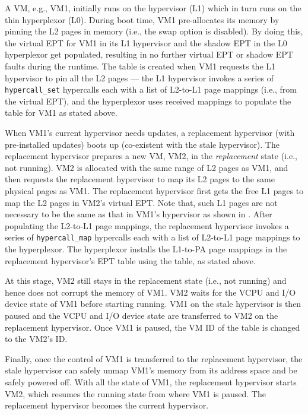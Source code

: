 A VM, e.g., VM1, initially runs on the hypervisor (L1) which in turn runs on the thin hyperplexor (L0). During boot time, VM1 pre-allocates its memory by pinning the L2 pages in memory (i.e., the swap option is disabled). By doing this, the virtual EPT for VM1 in its L1 hypervisor and the shadow EPT in the L0 hyperplexor get populated, resulting in no further virtual EPT or shadow EPT faults during the runtime. The \arch table is created when VM1 requests the L1 hypervisor to pin all the L2 pages --- the L1 hypervisor invokes a series of \texttt{hypercall\_set} hypercalls each with a list of L2-to-L1 page mappings (i.e., from the virtual EPT), and the hyperplexor uses received mappings to populate the \arch table for VM1 as stated above.



When VM1's current hypervisor needs updates, a replacement hypervisor (with pre-installed updates) boots up (co-existent with the stale hypervisor). The replacement hypervisor prepares a new VM, VM2, in the {\em replacement} state (i.e., not running). VM2 is allocated with the same range of L2 pages as VM1, and then requests the replacement hypervisor to map its L2 pages to the same physical pages as VM1. The replacement hypervisor first gets the free L1 pages to map the L2 pages in VM2's virtual EPT. Note that, such L1 pages are not necessary to be the same as that in VM1's hypervisor as shown in . After populating the L2-to-L1 page mappings, the replacement hypervisor invokes a series of \texttt{hypercall\_map} hypercalls each with a list of L2-to-L1 page mappings to the hyperplexor. The hyperplexor installs the L1-to-PA page mappings in the replacement hypervisor's EPT table using the \arch table, as stated above. 

At this stage, VM2 still stays in the replacement state (i.e., not running) and hence does not corrupt the memory of VM1. VM2 waits for the VCPU and I/O device state of VM1 before starting running. VM1 on the stale hypervisor is then paused and the VCPU and I/O device state are transferred to VM2 on the replacement hypervisor.  Once VM1 is paused, the VM ID of the \arch table is changed to the VM2's ID. 

Finally, once the control of VM1 is transferred to the replacement hypervisor, the stale hypervisor can safely unmap VM1's memory from its address space and be safely powered off. With all the state of VM1, the replacement hypervisor starts VM2, which resumes the running state from where VM1 is paused.  The replacement hypervisor becomes the current hypervisor. 


